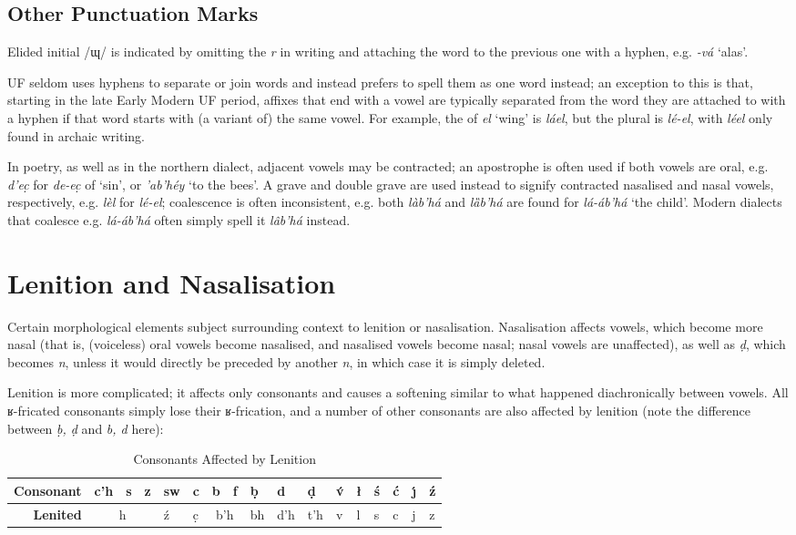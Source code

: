 \documentclass[a4paper, 12pt, twoside, openright, final]{book}
\let \nf \normalfont
\let \w \textit
\begin{document}
\subsection{Other Punctuation Marks}\label{subsec:other-punct}
\noindent Elided initial /ɰ/ is indicated by omitting the \w{r} in writing and attaching the word to the previous one with a hyphen,
e.g. \w{-vá} ‘alas’.

UF seldom uses hyphens to separate or join words and instead prefers to spell them as one word instead; an exception
to this is that, starting in the late Early Modern UF period, affixes that end with a vowel are typically separated
from the word they are attached to with a hyphen if that word starts with (a variant of) the same vowel. For example,
the  of \w{el} ‘wing’ is \w{láel}, but the plural is \w{lé-el}, with \w{léel} only found in archaic
writing.

In poetry, as well as in the northern dialect, adjacent vowels may be contracted; an apostrophe is often used if both vowels are oral, e.g. \w{d’ec̣} for
\w{de-ec̣}  of ‘sin’, or \w{’ab’héy} ‘to the bees’. A grave and double grave are used instead to signify contracted
nasalised and nasal vowels, respectively, e.g. \w{lèl} for \w{lé-el}; coalescence is often inconsistent, e.g. both \w{làb’há}
and \w{lȁb’há} are found for \w{lá-áb’há} ‘the child’. Modern dialects that coalesce e.g. \w{lá-áb’há} often simply spell it
\w{lâb’há} instead.

\section{Lenition and Nasalisation}
Certain morphological elements subject surrounding context to lenition or nasalisation. Nasalisation affects vowels,
which become more nasal (that is, (voiceless) oral vowels become nasalised, and nasalised vowels become nasal; nasal
vowels are unaffected), as well as \w{ḍ}, which becomes \w{n}, unless it would directly be preceded by another \w{n}, in
which case it is simply deleted.

Lenition is more complicated; it affects only consonants and causes a softening similar to what happened diachronically
between vowels. All ʁ-fricated consonants simply lose their ʁ-frication, and a number of other consonants are also
affected by lenition (note the difference between \w{ḅ, ḍ} and \w{b, d} here):

\begin{table}[H]
\centering
\itshape
\begin{tabular}{r|lll|l|l|ll|l|l|l|l|l|l|l|l|l}
\bf Consonant & c’h & s & z & sw     & c & b & f                        & ḅ   & d   & ḍ   & v́ & ł & ś & ć & ȷ́ & ź  \\\hline
\bf Lenited & \multicolumn{3}{c|}{h} & ź & c̣ & \multicolumn{2}{c|}{b’h} & bh  & d’h & t’h & v & l & s & c & j & z \\
\end{tabular}
\nf
\caption{Consonants Affected by Lenition}\label{tab:lenition}
\end{table}
\end{document}
